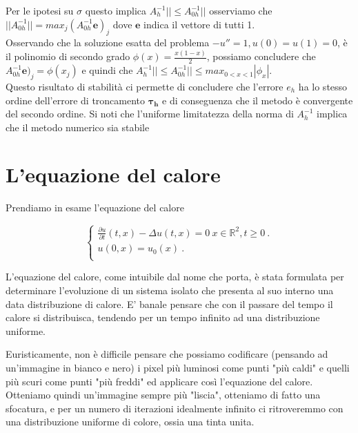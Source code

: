 Per le ipotesi su $\sigma$ questo implica $A_h^{-1}||\leq A_{0h}^{-1}||$
osserviamo che
$||A_{0h}^{-1}||=max_j(A_{0h}^{-1}\boldsymbol{e})_j$ dove $\boldsymbol{e}$ indica il vettore di tutti 1.\\
Osservando che la soluzione esatta del problema $-u'' = 1, u(0) = u(1) = 0$, è il polinomio di secondo grado $\phi(x) = \frac{x(1-x)}{2}$, possiamo concludere che $A_{0h}^{-1}\boldsymbol{e})_j=\phi(x_j)$ e quindi che $A_h^{-1}||\leq A_{0h}^{-1}||\leq max_{0<x<1}|\phi_x|$.\\
Questo risultato di stabilità ci permette di concludere che l’errore $e_h$ ha lo stesso ordine dell’errore di troncamento $\boldsymbol{\tau_h}$ e di conseguenza che il metodo è convergente del secondo ordine.
Si noti che l’uniforme limitatezza della norma di $A_h^{-1}$ implica che il metodo numerico sia stabile 






\section{L'equazione del calore}

\raggedright

Prendiamo in esame l'equazione del calore

\begin{equation} 
\begin{cases}

\frac{\partial u}{\partial t}(t,x)-\Delta u(t,x) = 0 \ x \in \mathbb R^2, t\ge 0 \ .\\ 

u(0,x) = u_0(x)\ . \\

\end{cases}
\end{equation}

L'equazione del calore, come intuibile dal nome che porta, è stata formulata per determinare l'evoluzione di un sistema isolato che presenta al suo interno una data distribuzione di calore. E' banale pensare che con il passare del tempo il calore si distribuisca, tendendo per un tempo infinito ad una distribuzione uniforme.

\vspace{1em}

Euristicamente, non è difficile pensare che possiamo codificare (pensando ad un'immagine in bianco e nero) i pixel più luminosi come punti "più caldi" e quelli più scuri come punti "più freddi" ed applicare così l'equazione del calore.\\
Otteniamo quindi un'immagine sempre più "liscia", otteniamo di fatto una sfocatura, e per un numero di iterazioni idealmente infinito ci ritroveremmo con una distribuzione uniforme di colore, ossia una tinta unita.

